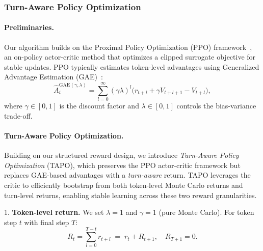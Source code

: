 \documentclass{article} %
\begin{document}
\subsubsection{Turn-Aware Policy Optimization}

\paragraph{Preliminaries.}
Our algorithm builds on the Proximal Policy Optimization (PPO) framework~\citep{schulman2017proximalpolicyoptimizationalgorithms}, an on-policy actor-critic method that optimizes a clipped surrogate objective for stable updates. PPO typically estimates token-level advantages using Generalized Advantage Estimation (GAE)~\citep{schulman2018highdimensionalcontinuouscontrolusing}:
\begin{equation}
\hat{A}_t^{\mathrm{GAE}(\gamma,\lambda)} 
= \sum_{l=0}^{\infty} (\gamma\lambda)^l \bigl(r_{t+l} + \gamma V_{t+l+1} - V_{t+l}\bigr),
\end{equation}
where $\gamma\in[0,1]$ is the discount factor and $\lambda\in[0,1]$ controls the bias-variance trade-off.  

\paragraph{Turn-Aware Policy Optimization.}
Building on our structured reward design, we introduce \emph{Turn-Aware Policy Optimization} (TAPO), which preserves the PPO actor-critic framework but replaces GAE-based advantages with a \emph{turn-aware} return. TAPO leverages the critic to efficiently bootstrap from both token-level Monte Carlo returns and turn-level returns, enabling stable learning across these two reward granularities.

1. \textbf{Token-level return.}  
We set $\lambda=1$ and $\gamma=1$ (pure Monte Carlo). For token step $t$ with final step $T$:  
\begin{equation}
R_t = \sum_{l=0}^{T-t} r_{t+l} \;=\; r_t + R_{t+1}, 
\quad R_{T+1}=0.
\end{equation}
\end{document}
